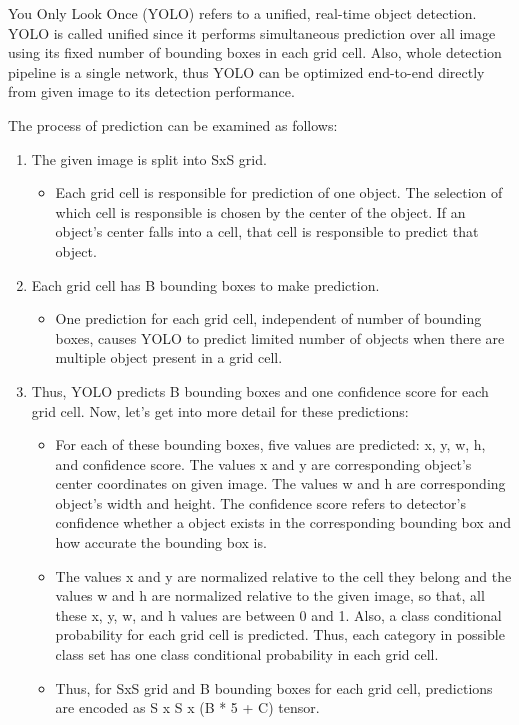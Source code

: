 \documentclass{article}
\begin{document}
\setlength{\parindent}{6ex}

\indent

You Only Look Once (YOLO) refers to a unified, real-time object detection. 
YOLO is called unified since it performs simultaneous prediction over 
all image using its fixed number of bounding boxes in each grid cell. 
Also, whole detection pipeline is a single network, thus YOLO can be 
optimized end-to-end directly from given image to its detection performance.
\par

The process of prediction can be examined as follows:
\begin{enumerate}
    \item The given image is split into SxS grid.
    \begin{itemize}
        \item Each grid cell is responsible for prediction of one object.
The selection of which cell is responsible is chosen by the center of 
the object. If an object's center falls into a cell, that cell is 
responsible to predict that object.
    \end{itemize}
    \item Each grid cell has B bounding boxes to make prediction.
    \begin{itemize}
        \item One prediction for each grid cell, independent of number of 
bounding boxes, causes YOLO to predict limited number of objects when 
there are multiple object present in a grid cell.
    \end{itemize}
    \item Thus, YOLO predicts B bounding boxes and one confidence score for 
each grid cell. Now, let's get into more detail for these predictions:
    \begin{itemize}
        \item For each of these bounding boxes, five values are predicted:
x, y, w, h, and confidence score. The values x and y are corresponding object's 
center coordinates on given image. The values w and h are corresponding object's 
width and height. The confidence score refers to detector's confidence whether a 
object exists in the corresponding bounding box and how accurate the bounding box is.
        \item The values x and y are normalized relative to the cell they belong and 
the values w and h are normalized relative to the given image, so that, all these 
x, y, w, and h values are between 0 and 1. Also, a class conditional probability for 
each grid cell is predicted. Thus, each category in possible class set has one 
class conditional probability in each grid cell. 
        \item Thus, for SxS grid and B bounding boxes for each grid cell, 
predictions are encoded as S x S x (B * 5 + C) tensor.
    \end{itemize}
\end{enumerate}
\end{document}
